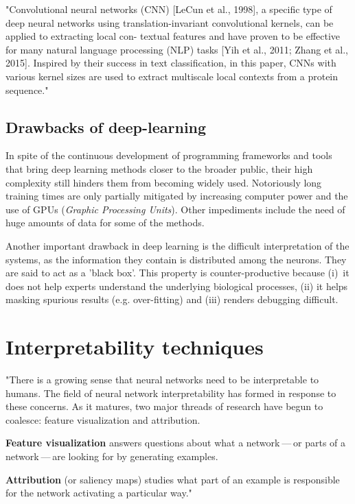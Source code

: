 	"Convolutional neural networks (CNN) [LeCun et al., 1998], a specific type of deep neural networks using translation-invariant convolutional kernels, can be applied to extracting local con- textual features and have proven to be effective for many natural language processing (NLP) tasks [Yih et al., 2011; Zhang et al., 2015]. Inspired by their success in text classification, in this paper, CNNs with various kernel sizes are used to extract multiscale local contexts from a protein sequence." \cite{Li2016}
	
	\subsection{Drawbacks of deep-learning}
	In spite of the continuous development of programming frameworks and tools that bring deep learning methods closer to the broader public, their high complexity still hinders them from becoming widely used. Notoriously long training times are only partially mitigated by increasing computer power and the use of GPUs (\textit{Graphic Processing Units}). Other impediments include the need of huge amounts of data for some of the methods.
	
	Another important drawback in deep learning is the difficult interpretation of the systems, as the information they contain is distributed among the neurons. They are said to act as a 'black box'. This property is counter-productive because (i)~it does not help experts understand the underlying biological processes, (ii) it helps masking spurious results (e.g. over-fitting) and (iii) renders debugging difficult.

\section{Interpretability techniques}

"There is a growing sense that neural networks need to be interpretable to humans. The field of neural network interpretability has formed in response to these concerns. As it matures, two major threads of research have begun to coalesce: feature visualization and attribution. 

\textbf{Feature visualization} answers questions about what a network — or parts of a network — are looking for by generating examples.

\textbf{Attribution} (or saliency maps) studies what part of an example is responsible for the network activating a particular way." \cite{Olah2017}

